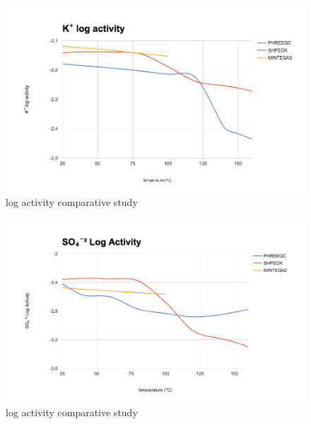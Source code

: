 \begin{figure}[ht!]
\centering
\includegraphics[width=140mm]{figures/k+.png}
\caption{ log activity comparative study}
\label{fig:k+}
\end{figure}

\begin{figure}[ht!]
\centering
\includegraphics[width=140mm]{figures/so4-2.png}
\caption{ log activity comparative study}
\label{fig:so4-2}
\end{figure}


